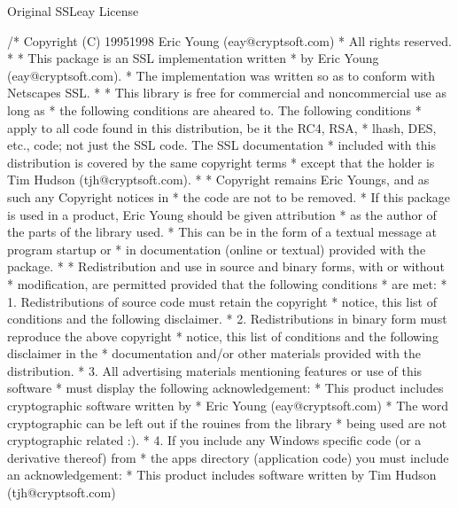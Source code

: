 \documentclass[a4,10pt,spanish]{sphinxmanual}
\begin{document}
\begin{sphinxVerbatim}[commandchars=\\\{\}]
Original SSLeay License
\PYGZhy{}\PYGZhy{}\PYGZhy{}\PYGZhy{}\PYGZhy{}\PYGZhy{}\PYGZhy{}\PYGZhy{}\PYGZhy{}\PYGZhy{}\PYGZhy{}\PYGZhy{}\PYGZhy{}\PYGZhy{}\PYGZhy{}\PYGZhy{}\PYGZhy{}\PYGZhy{}\PYGZhy{}\PYGZhy{}\PYGZhy{}\PYGZhy{}\PYGZhy{}

   /* Copyright (C) 1995\PYGZhy{}1998 Eric Young (eay@cryptsoft.com)
    * All rights reserved.
    *
    * This package is an SSL implementation written
    * by Eric Young (eay@cryptsoft.com).
    * The implementation was written so as to conform with Netscapes SSL.
    *
    * This library is free for commercial and non\PYGZhy{}commercial use as long as
    * the following conditions are aheared to.  The following conditions
    * apply to all code found in this distribution, be it the RC4, RSA,
    * lhash, DES, etc., code; not just the SSL code.  The SSL documentation
    * included with this distribution is covered by the same copyright terms
    * except that the holder is Tim Hudson (tjh@cryptsoft.com).
    *
    * Copyright remains Eric Young\PYGZsq{}s, and as such any Copyright notices in
    * the code are not to be removed.
    * If this package is used in a product, Eric Young should be given attribution
    * as the author of the parts of the library used.
    * This can be in the form of a textual message at program startup or
    * in documentation (online or textual) provided with the package.
    *
    * Redistribution and use in source and binary forms, with or without
    * modification, are permitted provided that the following conditions
    * are met:
    * 1. Redistributions of source code must retain the copyright
    *    notice, this list of conditions and the following disclaimer.
    * 2. Redistributions in binary form must reproduce the above copyright
    *    notice, this list of conditions and the following disclaimer in the
    *    documentation and/or other materials provided with the distribution.
    * 3. All advertising materials mentioning features or use of this software
    *    must display the following acknowledgement:
    *    \PYGZdq{}This product includes cryptographic software written by
    *     Eric Young (eay@cryptsoft.com)\PYGZdq{}
    *    The word \PYGZsq{}cryptographic\PYGZsq{} can be left out if the rouines from the library
    *    being used are not cryptographic related :\PYGZhy{}).
    * 4. If you include any Windows specific code (or a derivative thereof) from
    *    the apps directory (application code) you must include an acknowledgement:
    *    \PYGZdq{}This product includes software written by Tim Hudson (tjh@cryptsoft.com)\PYGZdq{}

\end{sphinxVerbatim}
\end{document}
